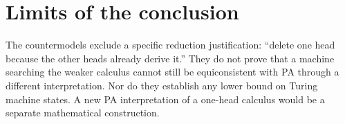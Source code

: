 \documentclass[10pt]{article}
\begin{document}
\section{Limits of the conclusion}

The countermodels exclude a specific reduction justification:
``delete one head because the other heads already derive it.''
They do not prove that a machine searching the weaker calculus
cannot still be equiconsistent with PA through a different
interpretation.  Nor do they establish any lower bound on Turing
machine states.  A new PA interpretation of a one-head calculus
would be a separate mathematical construction.
\end{document}
